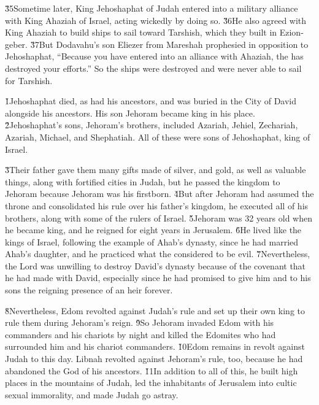 \v{35}Sometime later, King Jehoshaphat of Judah entered into a military alliance with King Ahaziah of Israel, acting wickedly by doing so. \v{36}He also agreed with King Ahaziah to build ships to sail toward Tarshish, which they built in Ezion-geber. \v{37}But Dodavahu's son Eliezer from Mareshah prophesied in opposition to Jehoshaphat, ``Because you have entered into an alliance with Ahaziah, the  has destroyed your efforts.'' So the ships were destroyed and were never able to sail for Tarshish.

\v{1}Jehoshaphat died, as had his ancestors, and was buried in the City of David alongside his ancestors. His son Jehoram became king in his place. \v{2}Jehoshaphat's sons, Jehoram's brothers, included Azariah, Jehiel, Zechariah, Azariah, Michael, and Shephatiah. All of these were sons of Jehoshaphat, king of Israel.

\v{3}Their father gave them many gifts made of silver, and gold, as well as valuable things, along with fortified cities in Judah, but he passed the kingdom to Jehoram because Jehoram was his firstborn. \v{4}But after Jehoram had assumed the throne and consolidated his rule over his father's kingdom, he executed all of his brothers, along with some of the rulers of Israel. \v{5}Jehoram was 32 years old when he became king, and he reigned for eight years in Jerusalem. \v{6}He lived like the kings of Israel, following the example of Ahab's dynasty, since he had married Ahab's daughter, and he practiced what the  considered to be evil. \v{7}Nevertheless, the Lord was unwilling to destroy David's dynasty because of the covenant that he had made with David, especially since he had promised to give him and to his sons the reigning presence of an heir forever.

\v{8}Nevertheless, Edom revolted against Judah's rule and set up their own king to rule them during Jehoram's reign. \v{9}So Jehoram invaded Edom with his commanders and his chariots by night and killed the Edomites who had surrounded him and his chariot commanders. \v{10}Edom remains in revolt against Judah to this day. Libnah revolted against Jehoram's rule, too, because he had abandoned the  God of his ancestors. \v{11}In addition to all of this, he built high places in the mountains of Judah, led the inhabitants of Jerusalem into cultic sexual immorality, and made Judah go astray.

